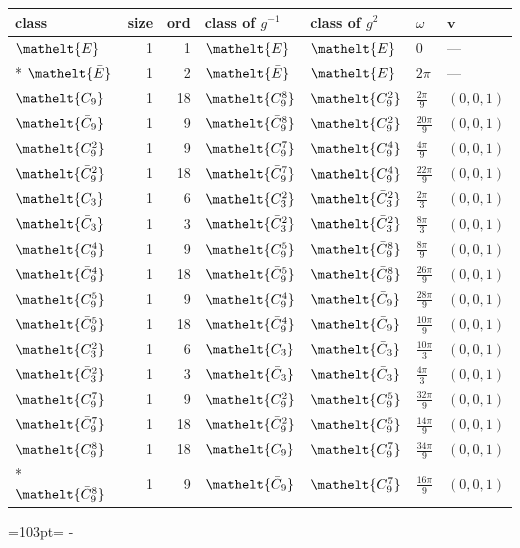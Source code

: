 \documentclass[10pt,a4paper]{article}
\newcommand{\needspace}[1]{\par\penalty-100\begingroup\dimen0=#1\relax\dimen2=\pagegoal
  \advance\dimen2-\pagetotal\ifdim\dimen0>\dimen2\relax\ifdim\dimen2>0pt\vfil\break\fi\fi
  \endgroup}
\numberwithin{equation}{section}
\newcommand{\eltfont}[1]{{\let\sigma\eltsigma\mathelt{#1}}}
\newcommand{\cls}[1]{\eltfont{#1}}
\newcommand{\dirvec}[3]{(#1, #2, #3)}
\newcommand{\vv}{\mathbf{v}}
\newcommand{\barred}[1]{\bar{#1}}
\begin{document}
{\renewcommand{\arraystretch}{1.3}\begin{longtable}{@{}lrrllll@{}}\toprule
class & size & ord & class of $g^{-1}$ & class of $g^{2}$ & $\omega$ & $\vv$\\\midrule\endhead
\bottomrule\endfoot\endlastfoot
$\cls{E}$ & 1 & 1 & $\cls{E}$ & $\cls{E}$ & $0$ & ---\\*
$\cls{\barred{E}}$ & 1 & 2 & $\cls{\barred{E}}$ & $\cls{E}$ & $2\pi$ & ---\\
$\cls{C_{9}}$ & 1 & 18 & $\cls{C_{9}^{8}}$ & $\cls{C_{9}^{2}}$ & $\tfrac{2\pi}{9}$ & $\dirvec{0}{0}{1}$\\
$\cls{\barred{C}_{9}}$ & 1 & 9 & $\cls{\barred{C}_{9}^{8}}$ & $\cls{C_{9}^{2}}$ & $\tfrac{20\pi}{9}$ & $\dirvec{0}{0}{1}$\\
$\cls{C_{9}^{2}}$ & 1 & 9 & $\cls{C_{9}^{7}}$ & $\cls{C_{9}^{4}}$ & $\tfrac{4\pi}{9}$ & $\dirvec{0}{0}{1}$\\
$\cls{\barred{C}_{9}^{2}}$ & 1 & 18 & $\cls{\barred{C}_{9}^{7}}$ & $\cls{C_{9}^{4}}$ & $\tfrac{22\pi}{9}$ & $\dirvec{0}{0}{1}$\\
$\cls{C_{3}}$ & 1 & 6 & $\cls{C_{3}^{2}}$ & $\cls{\barred{C}_{3}^{2}}$ & $\tfrac{2\pi}{3}$ & $\dirvec{0}{0}{1}$\\
$\cls{\barred{C}_{3}}$ & 1 & 3 & $\cls{\barred{C}_{3}^{2}}$ & $\cls{\barred{C}_{3}^{2}}$ & $\tfrac{8\pi}{3}$ & $\dirvec{0}{0}{1}$\\
$\cls{C_{9}^{4}}$ & 1 & 9 & $\cls{C_{9}^{5}}$ & $\cls{\barred{C}_{9}^{8}}$ & $\tfrac{8\pi}{9}$ & $\dirvec{0}{0}{1}$\\
$\cls{\barred{C}_{9}^{4}}$ & 1 & 18 & $\cls{\barred{C}_{9}^{5}}$ & $\cls{\barred{C}_{9}^{8}}$ & $\tfrac{26\pi}{9}$ & $\dirvec{0}{0}{1}$\\
$\cls{C_{9}^{5}}$ & 1 & 9 & $\cls{C_{9}^{4}}$ & $\cls{\barred{C}_{9}}$ & $\tfrac{28\pi}{9}$ & $\dirvec{0}{0}{1}$\\
$\cls{\barred{C}_{9}^{5}}$ & 1 & 18 & $\cls{\barred{C}_{9}^{4}}$ & $\cls{\barred{C}_{9}}$ & $\tfrac{10\pi}{9}$ & $\dirvec{0}{0}{1}$\\
$\cls{C_{3}^{2}}$ & 1 & 6 & $\cls{C_{3}}$ & $\cls{\barred{C}_{3}}$ & $\tfrac{10\pi}{3}$ & $\dirvec{0}{0}{1}$\\
$\cls{\barred{C}_{3}^{2}}$ & 1 & 3 & $\cls{\barred{C}_{3}}$ & $\cls{\barred{C}_{3}}$ & $\tfrac{4\pi}{3}$ & $\dirvec{0}{0}{1}$\\
$\cls{C_{9}^{7}}$ & 1 & 9 & $\cls{C_{9}^{2}}$ & $\cls{C_{9}^{5}}$ & $\tfrac{32\pi}{9}$ & $\dirvec{0}{0}{1}$\\
$\cls{\barred{C}_{9}^{7}}$ & 1 & 18 & $\cls{\barred{C}_{9}^{2}}$ & $\cls{C_{9}^{5}}$ & $\tfrac{14\pi}{9}$ & $\dirvec{0}{0}{1}$\\
$\cls{C_{9}^{8}}$ & 1 & 18 & $\cls{C_{9}}$ & $\cls{C_{9}^{7}}$ & $\tfrac{34\pi}{9}$ & $\dirvec{0}{0}{1}$\\*
$\cls{\barred{C}_{9}^{8}}$ & 1 & 9 & $\cls{\barred{C}_{9}}$ & $\cls{C_{9}^{7}}$ & $\tfrac{16\pi}{9}$ & $\dirvec{0}{0}{1}$\\
\bottomrule\end{longtable}}
\needspace{103pt}
\end{document}
